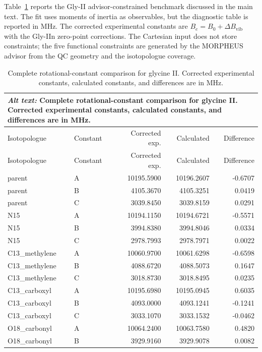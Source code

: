 \documentclass[12pt]{article}
\begin{document}
Table~\ref{tab:si-glycine-rotconstants} reports the Gly-II advisor-constrained
benchmark discussed in the main text. The fit uses moments of inertia as
observables, but the diagnostic table is reported in MHz. The corrected
experimental constants are $B_e=B_0+\Delta B_\mathrm{vib}$ with the Gly-IIn
zero-point corrections. The Cartesian input does not store constraints; the
five functional constraints are generated by the MORPHEUS advisor from the QC
geometry and the isotopologue coverage.

\begin{longtable}{llrrr}
\caption{Complete rotational-constant comparison for glycine II. Corrected experimental constants, calculated constants, and differences are in MHz.}\label{tab:si-glycine-rotconstants}\\
\multicolumn{5}{p{0.98\linewidth}}{\textit{Alt text:} Complete rotational-constant comparison for glycine II. Corrected experimental constants, calculated constants, and differences are in MHz.}\\
\toprule
Isotopologue & Constant & Corrected exp. & Calculated & Difference \\
\midrule
\endfirsthead
\toprule
Isotopologue & Constant & Corrected exp. & Calculated & Difference \\
\midrule
\endhead
parent & A & 10195.5900 & 10196.2607 & -0.6707 \\
parent & B & 4105.3670 & 4105.3251 & 0.0419 \\
parent & C & 3039.8450 & 3039.8159 & 0.0291 \\
N15 & A & 10194.1150 & 10194.6721 & -0.5571 \\
N15 & B & 3994.8380 & 3994.8046 & 0.0334 \\
N15 & C & 2978.7993 & 2978.7971 & 0.0022 \\
C13\_methylene & A & 10060.9700 & 10061.6298 & -0.6598 \\
C13\_methylene & B & 4088.6720 & 4088.5073 & 0.1647 \\
C13\_methylene & C & 3018.8730 & 3018.8495 & 0.0235 \\
C13\_carboxyl & A & 10195.6980 & 10195.0945 & 0.6035 \\
C13\_carboxyl & B & 4093.0000 & 4093.1241 & -0.1241 \\
C13\_carboxyl & C & 3033.1070 & 3033.1532 & -0.0462 \\
O18\_carbonyl & A & 10064.2400 & 10063.7580 & 0.4820 \\
O18\_carbonyl & B & 3929.9160 & 3929.9078 & 0.0082 \\

\end{longtable}
\end{document}

